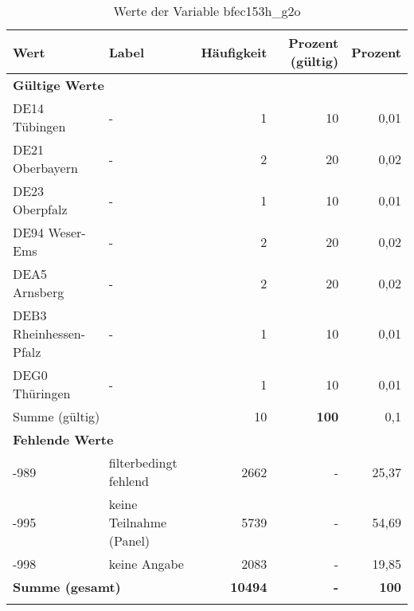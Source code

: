      \begin{longtable}{Xlrrr}
     \toprule
     \textbf{Wert} & \textbf{Label} & \textbf{Häufigkeit} & \textbf{Prozent (gültig)} & \textbf{Prozent} \\
     \endhead
     \midrule
     \multicolumn{5}{l}{\textbf{Gültige Werte}}\\

     \multicolumn{1}{X}{DE14 Tübingen} &
     - &
     1 &
     10 &
     0,01 \\

     \multicolumn{1}{X}{DE21 Oberbayern} &
     - &
     2 &
     20 &
     0,02 \\

     \multicolumn{1}{X}{DE23 Oberpfalz} &
     - &
     1 &
     10 &
     0,01 \\

     \multicolumn{1}{X}{DE94 Weser-Ems} &
     - &
     2 &
     20 &
     0,02 \\

     \multicolumn{1}{X}{DEA5 Arnsberg} &
     - &
     2 &
     20 &
     0,02 \\

     \multicolumn{1}{X}{DEB3 Rheinhessen-Pfalz} &
     - &
     1 &
     10 &
     0,01 \\

     \multicolumn{1}{X}{DEG0 Thüringen} &
     - &
     1 &
     10 &
     0,01 \\
     \midrule
      \multicolumn{2}{l}{Summe (gültig)} & 10 &
      \textbf{100} &
         0,1 \\
     \multicolumn{5}{l}{\textbf{Fehlende Werte}}\\
       -989 & filterbedingt fehlend & 2662 & - & 25,37 \\

       -995 & keine Teilnahme (Panel) & 5739 & - & 54,69 \\

       -998 & keine Angabe & 2083 & - & 19,85 \\

     \midrule
     \multicolumn{2}{l}{\textbf{Summe (gesamt)}} & \textbf{10494} & \textbf{-} & \textbf{100} \\
     \bottomrule
     \caption{Werte der Variable bfec153h\_g2o}
     \end{longtable}
     
